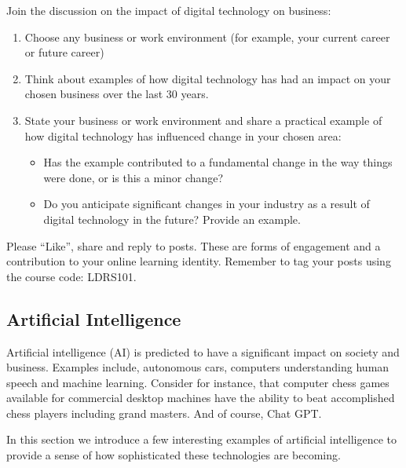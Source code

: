 \documentclass[
]{book}
\providecommand{\tightlist}{%
  \setlength{\itemsep}{0pt}\setlength{\parskip}{0pt}}
\theoremstyle{definition}
\theoremstyle{definition}
\theoremstyle{definition}
\theoremstyle{definition}
\theoremstyle{remark}
\begin{document}
\begin{reflect}
Join the discussion on the impact of digital technology on business:

\begin{enumerate}
\def\labelenumi{\arabic{enumi}.}
\tightlist
\item
  Choose any business or work environment (for example, your current career or future career)\\
\item
  Think about examples of how digital technology has had an impact on your chosen business over the last 30 years.\\
\item
  State your business or work environment and share a practical example of how digital technology has influenced change in your chosen area:

  \begin{itemize}
  \tightlist
  \item
    Has the example contributed to a fundamental change in the way things were done, or is this a minor change?\\
  \item
    Do you anticipate significant changes in your industry as a result of digital technology in the future? Provide an example.
  \end{itemize}
\end{enumerate}

Please ``Like'', share and reply to posts. These are forms of engagement and a contribution to your online learning identity. Remember to tag your posts using the course code: LDRS101.
\end{reflect}

\hypertarget{artificial-intelligence}{%
\subsection*{Artificial Intelligence}\label{artificial-intelligence}}

Artificial intelligence (AI) is predicted to have a significant impact on society and business. Examples include, autonomous cars, computers understanding human speech and machine learning. Consider for instance, that computer chess games available for commercial desktop machines have the ability to beat accomplished chess players including grand masters. And of course, Chat GPT.

In this section we introduce a few interesting examples of artificial intelligence to provide a sense of how sophisticated these technologies are becoming.
\end{document}
